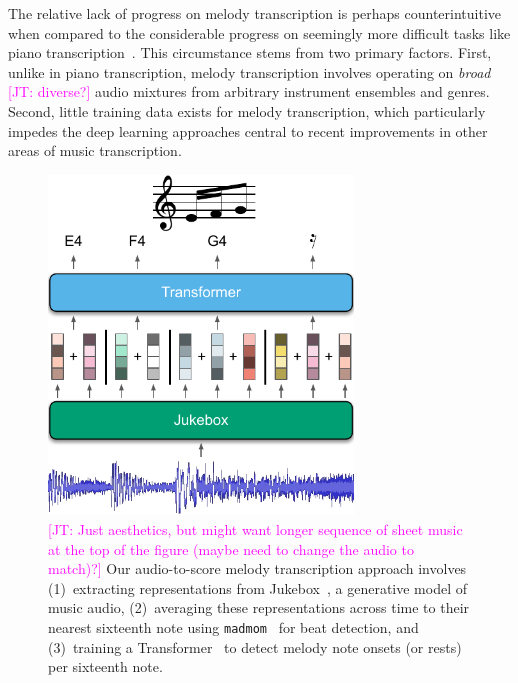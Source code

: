 \documentclass{article}
\newcommand{\madmom}{\texttt{madmom}}
\newcommand\john[1]{\textcolor{magenta}{[JT: #1]}}
\begin{document}
The relative lack of progress on melody transcription is perhaps counterintuitive when compared to the considerable progress on seemingly more difficult tasks like piano transcription~\cite{sigtia2016end,hawthorne2017onsets}.
This circumstance stems from two primary factors. 
First, unlike in piano transcription, melody transcription involves operating on \emph{broad} \john{diverse?} audio mixtures from arbitrary instrument ensembles and genres. 
Second, little training data exists for melody transcription, which particularly impedes the deep learning approaches central to recent improvements in other areas of music transcription. 

\begin{figure}
    \centering
    \includegraphics[width=8.1cm]{figs/fig1.pdf}
    \caption{
\john{Just aesthetics, but might want longer sequence of sheet music at the top of the figure (maybe need to change the audio to match)?} Our audio-to-score melody transcription approach involves 
(1)~extracting representations from Jukebox~\cite{dhariwal2020jukebox}, a generative model of music audio, 
(2)~averaging these representations across time to their nearest sixteenth note using \madmom~\cite{bock2016madmom,bock2016joint} for beat detection,
and
(3)~training a Transformer~\cite{vaswani2017attention} to detect melody note onsets (or rests) per sixteenth note.
}
 \label{fig:fig1}
\end{figure}
\end{document}
